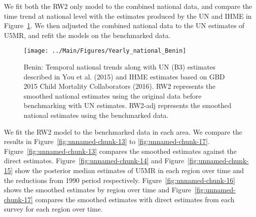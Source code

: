 \documentclass[12pt]{article}\usepackage[]{graphicx}\usepackage[]{color}
\newenvironment{knitrout}{}{} %
\begin{document}
We fit both the RW2 only model to the combined national data, and compare the time trend at national level with the estimates produced by the UN and IHME in Figure~\ref{fig:unnamed-chunk-12}. We then adjusted the combined national data to the UN estimates of U5MR, and refit the models on the benchmarked data. 

\begin{knitrout}
\color{fgcolor}\begin{figure}[bht]

{\centering \texttt{[image: ../Main/Figures/Yearly\_national\_Benin]} 

}

\caption[Benin]{Benin: Temporal national trends along with UN (B3) estimates described in You et al. (2015) and IHME estimates based on GBD 2015 Child Mortality Collaborators (2016). RW2 represents the smoothed national estimates using the original data before benchmarking with UN estimates. RW2-adj represents the smoothed national estimates using the benchmarked data.}\label{fig:unnamed-chunk-12}
\end{figure}


\end{knitrout}
 

We fit the RW2 model to the benchmarked data in each area. 
We compare the results in Figure~\ref{fig:unnamed-chunk-13} to \ref{fig:unnamed-chunk-17}.
Figure~\ref{fig:unnamed-chunk-13} compares the smoothed estimates against the direct estimates. Figure~\ref{fig:unnamed-chunk-14} and Figure~\ref{fig:unnamed-chunk-15} show the posterior median estimates of U5MR in each region over time and the reductions from 1990 period respectively.
Figure~\ref{fig:unnamed-chunk-16} shows the smoothed estimates by region over time and Figure~\ref{fig:unnamed-chunk-17} compares the smoothed estimates with direct estimates from each survey for each region over time.




\end{document}
